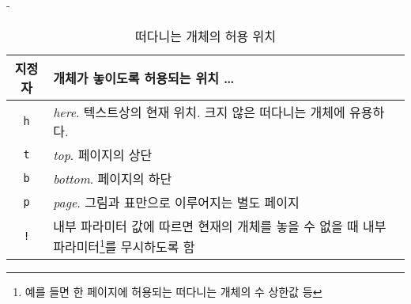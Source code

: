 \begin{adjustwidth}{0pt}{-\margheadwidth}
\begin{table}[!bp]
\caption{떠다니는 개체의 허용 위치}\label{tab:permiss}
\noindent \begin{minipage}{\textwidth}
\medskip
\begin{center}
\begin{tabular}{@{}cp{8cm}@{}}
지정자&개체가 놓이도록 허용되는 위치 \ldots\\
\hline
\rule{0pt}{1.05em}\texttt{h} & \emph{here}. 텍스트상의 현재 위치. 크지 않은 떠다니는 개체에 유용하다.\\[0.3ex]
\texttt{t} & \emph{top}. 페이지의 상단\\[0.3ex]
\texttt{b} & \emph{bottom}. 페이지의 하단\\[0.3ex]
\texttt{p} & \emph{page}. 그림과 표만으로 이루어지는 별도 페이지\\[0.3ex]
\texttt{!} & 내부 파라미터 값에 따르면 현재의 개체를 놓을 수 없을 때 내부 파라미터\footnote{예를 들면 한 페이지에 허용되는 떠다니는 개체의 수 상한값 등}를 무시하도록 함
\end{tabular}
\end{center}
\end{minipage}
\end{table}


\end{adjustwidth}
